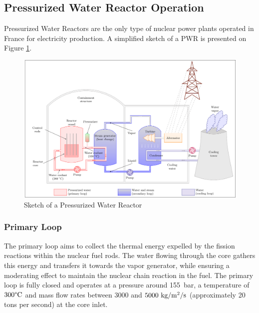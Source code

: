%
%
%



\subsection{Pressurized Water Reactor Operation}

Pressurized Water Reactors are the only type of nuclear power plants operated in France for electricity production. A simplified sketch of a PWR is presented on Figure \ref{fig:pwr_sketch}.

\begin{figure}[!h]
\centering
\includegraphics[width=1.0\linewidth]{img/intro/pwr_tikz.pdf}
\caption{Sketch of a Pressurized Water Reactor \cite{faccanoni_etude_2008}}
\label{fig:pwr_sketch}
\end{figure}

\npar

\subsubsection{Primary Loop}

The primary loop aims to collect the thermal energy expelled by the fission reactions within the nuclear fuel rods. The water flowing through the core gathers this energy and transfers it towards the vapor generator, while ensuring a moderating effect to maintain the nuclear chain reaction in the fuel. The primary loop is fully closed and operates at a pressure around 155\ bar, a temperature of $300\degree\mathrm{C}$ and mass flow rates between $3000$ and $5000\ \text{kg/m$^{2}$/s}$ (approximately 20 tons per second) at the core inlet.  

